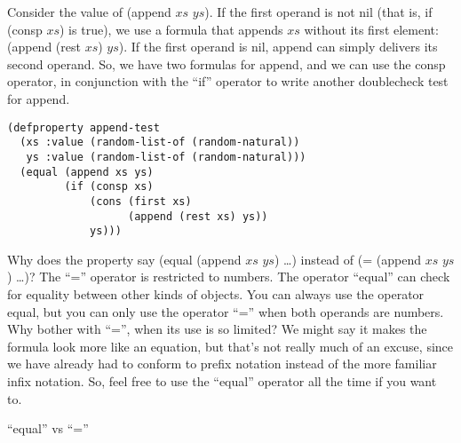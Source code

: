 Consider the value of (append $xs$ $ys$).
If the first operand is not nil (that is, if (consp $xs$) is true),
we use a formula that appends $xs$ without its first element: (append (rest $xs$) $ys$).
If the first operand is nil, append can simply delivers its second operand.
So, we have two formulas for append, and we can use the consp operator,
in conjunction with the ``if'' operator
to write another doublecheck test for append.

\begin{samepage}
\begin{Verbatim}
(defproperty append-test
  (xs :value (random-list-of (random-natural))
   ys :value (random-list-of (random-natural)))
  (equal (append xs ys)
         (if (consp xs)
             (cons (first xs)
                   (append (rest xs) ys))
             ys)))
\end{Verbatim}
\end{samepage}

\begin{aside}
Why does the property say (equal (append $xs$ $ys$) \dots)
instead of (= (append $xs$ $ys$) \dots)?
The ``='' operator
is restricted to numbers. The operator ``equal'' can check
for equality between other kinds of objects.
You can always use the operator equal,
but you can only use the operator ``='' when both operands are numbers.
Why bother with ``='', when its use is so limited?
We might say it makes the formula look more like an equation,
but that's not really much of an excuse,
since we have already had to conform to prefix notation
instead of the more familiar infix notation.
So, feel free to use the ``equal'' operator all the time if you want to.
\caption{``equal'' vs ``=''}
\label{equal}
\end{aside}

\begin{comment}
This might not be the first test you would think of, but if the test failed to pass, you would for sure know something was wrong with the append operator.
This is another property that ACL2 can prove when it is stated as a theorem.

\begin{Verbatim}
(defthmd append-thm
  (equal (append xs ys)
         (if (consp xs)
             (cons (first xs)            ; {app1}
                   (append (rest xs) ys))
             ys)))                       ; {app0}
\end{Verbatim}
\end{comment}

